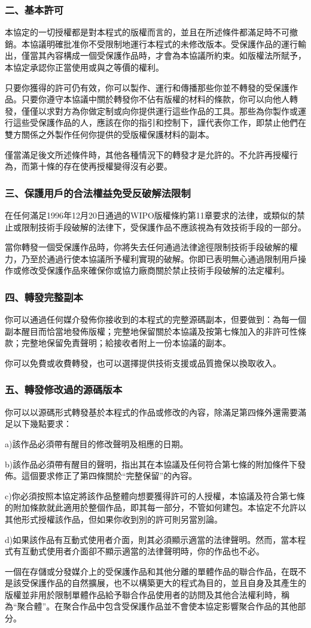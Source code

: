 \subsubsection{二、基本許可}
本協定的一切授權都是對本程式的版權而言的，並且在所述條件都滿足時不可撤銷。本協議明確批准你不受限制地運行本程式的未修改版本。受保護作品的運行輸出，僅當其內容構成一個受保護作品時，才會為本協議所約束。如版權法所賦予，本協定承認你正當使用或與之等價的權利。\par
只要你獲得的許可仍有效，你可以製作、運行和傳播那些你並不轉發的受保護作品。只要你遵守本協議中關於轉發你不佔有版權的材料的條款，你可以向他人轉發，僅僅以求對方為你做定制或向你提供運行這些作品的工具。那些為你製作或運行這些受保護作品的人，應該在你的指引和控制下，謹代表你工作，即禁止他們在雙方關係之外製作任何你提供的受版權保護材料的副本。\par
僅當滿足後文所述條件時，其他各種情況下的轉發才是允許的。不允許再授權行為，而第十條的存在使再授權變得沒有必要。
\subsubsection{三、保護用戶的合法權益免受反破解法限制}
在任何滿足1996年12月20日通過的WIPO版權條約第11章要求的法律，或類似的禁止或限制技術手段破解的法律下，受保護作品不應該視為有效技術手段的一部分。\par
當你轉發一個受保護作品時，你將失去任何通過法律途徑限制技術手段破解的權力，乃至於通過行使本協議所予權利實現的破解。你即已表明無心通過限制用戶操作或修改受保護作品來確保你或協力廠商關於禁止技術手段破解的法定權利。
\subsubsection{四、轉發完整副本}
你可以通過任何媒介發佈你接收到的本程式的完整源碼副本，但要做到：為每一個副本醒目而恰當地發佈版權；完整地保留關於本協議及按第七條加入的非許可性條款；完整地保留免責聲明；給接收者附上一份本協議的副本。\par
你可以免費或收費轉發，也可以選擇提供技術支援或品質擔保以換取收入。
\subsubsection{五、轉發修改過的源碼版本}
你可以以源碼形式轉發基於本程式的作品或修改的內容，除滿足第四條外還需要滿足以下幾點要求：\par
a)該作品必須帶有醒目的修改聲明及相應的日期。\par
b)該作品必須帶有醒目的聲明，指出其在本協議及任何符合第七條的附加條件下發佈。這個要求修正了第四條關於“完整保留”的內容。\par
c)你必須按照本協定將該作品整體向想要獲得許可的人授權，本協議及符合第七條的附加條款就此適用於整個作品，即其每一部分，不管如何建包。本協定不允許以其他形式授權該作品，但如果你收到別的許可則另當別論。\par
d)如果該作品有互動式使用者介面，則其必須顯示適當的法律聲明。然而，當本程式有互動式使用者介面卻不顯示適當的法律聲明時，你的作品也不必。\par
一個在存儲或分發媒介上的受保護作品和其他分離的單體作品的聯合作品，在既不是該受保護作品的自然擴展，也不以構築更大的程式為目的，並且自身及其產生的版權並非用於限制單體作品給予聯合作品使用者的訪問及其他合法權利時，稱為“聚合體”。在聚合作品中包含受保護作品並不會使本協定影響聚合作品的其他部分。
